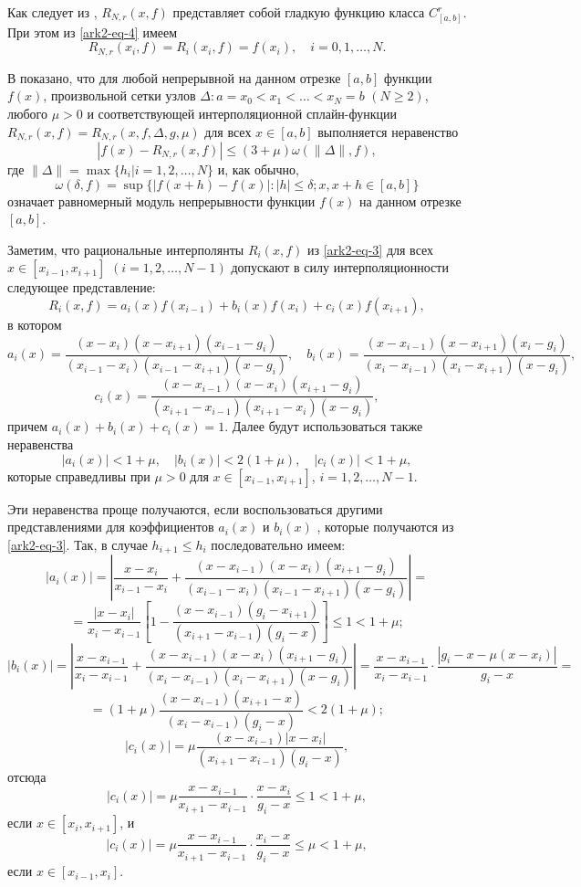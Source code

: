 Как следует из \cite{ark-9}, $R_{N,r}(x,f)$ представляет собой гладкую функцию
 класса $C^r_{[a,b]}$. При этом из \eqref{ark2-eq-4} имеем
\begin{equation}\label{ark2-eq-5}
R_{N,r}(x_i,f)=R_i(x_i,f)=f(x_i),\quad i=0,1,\dots,N.
\end{equation}

В \cite{ark-10} показано, что для любой непрерывной на данном отрезке $[a,b]$ функции $f(x)$,
произвольной сетки узлов $\Delta: a=x_0<x_1<\dots<x_N=b$ $(N\geqslant 2)$, любого
$\mu>0$ и соответствующей интерполяционной сплайн-функции
$R_{N,r}(x,f)=R_{N,r}(x,f,\Delta,g,\mu)$ для всех $x\in[a,b]$ выполняется неравенство
\begin{equation}\label{ark2-eq-6}
|f(x)-R_{N,r}(x,f)|\leqslant (3+\mu)\omega(\|\Delta\|,f),
\end{equation}
где $\|\Delta\|=\max\{h_i|i=1,2,\dots,N\}$ и, как обычно,
$$
\omega(\delta, f)=\sup\{|f(x+h)-f(x)|: |h|\leqslant \delta; x,x+h\in [a,b]\}
$$
означает равномерный модуль непрерывности функции $f(x)$ на данном отрезке $[a,b]$.

Заметим, что рациональные интерполянты $R_i(x,f)$ из \eqref{ark2-eq-3} для всех $x\in[x_{i-1},x_{i+1}]$
$(i=1,2,\dots,N-1)$ допускают в силу интерполяционности следующее представление:
\begin{equation}\label{ark2-eq-7}
R_i(x,f)=a_i(x)f(x_{i-1})+b_i(x)f(x_i)+c_i(x)f(x_{i+1}),
\end{equation}
в котором
$$
a_i(x)=\frac{(x-x_i)(x-x_{i+1})(x_{i-1}-g_i)}
{(x_{i-1}-x_i)(x_{i-1}-x_{i+1})(x-g_i)},
\quad
b_i(x)=\frac{(x-x_{i-1})(x-x_{i+1})(x_i-g_i)}
{(x_i-x_{i-1})(x_i-x_{i+1})(x-g_i)},
$$
$$
c_i(x)=\frac{(x-x_{i-1})(x-x_i)(x_{i+1}-g_i)}
{(x_{i+1}-x_{i-1})(x_{i+1}-x_i)(x-g_i)},
$$
причем $a_i(x)+b_i(x)+c_i(x)=1$.
Далее будут использоваться также неравенства
\begin{equation}\label{ark2-eq-8}
|a_i(x)|<1+\mu, \quad |b_i(x)|<2(1+\mu),\quad |c_i(x)|<1+\mu,
\end{equation}
которые справедливы при $\mu>0$ для $x\in[x_{i-1},x_{i+1}]$, $i=1,2,\dots,N-1$.

Эти неравенства проще получаются, если воспользоваться другими представлениями
для коэффициентов $a_i(x)$ и $b_i(x)$  , которые получаются \cite{ark-10} из \eqref{ark2-eq-3}.
Так, в случае $h_{i+1}\leqslant h_i$ последовательно имеем:
$$
|a_i(x)|=\left\vert \frac{x-x_i}{x_{i-1}-x_i}+\frac{(x-x_{i-1})(x-x_i)(x_{i+1}-g_i)}
{(x_{i-1}-x_i)(x_{i-1}-x_{i+1})(x-g_i)}\right\vert=
$$
$$
=\frac{|x-x_i|}{x_i-x_{i-1}}
\left[1-\frac{(x-x_{i-1})(g_i-x_{i+1})}{(x_{i+1}-x_{i-1})(g_i-x)}\right]\leqslant 1<1+\mu;
$$
$$
|b_i(x)|=\left\vert \frac{x-x_{i-1}}{x_i-x_{i-1}}+\frac{(x-x_{i-1})(x-x_i)(x_{i+1}-g_i)}
{(x_i-x_{i-1})(x_i-x_{i+1})(x-g_i)}\right\vert=
\frac{x-x_{i-1}}{x_i-x_{i-1}}\cdot\frac{|g_i-x-\mu(x-x_i)|}{g_i-x}=
$$
$$
=(1+\mu)\frac{(x-x_{i-1})(x_{i+1}-x)}{(x_i-x_{i-1})(g_i-x)}<2(1+\mu);
$$
$$
|c_i(x)|=\mu
\frac{(x-x_{i-1})|x-x_i|}{(x_{i+1}-x_{i-1})(g_i-x)},
$$
отсюда
$$
|c_i(x)|=\mu\frac{x-x_{i-1}}{x_{i+1}-x_{i-1}}\cdot \frac{x-x_i}{g_i-x}\leqslant 1<1+\mu,
$$
если $x\in[x_i, x_{i+1}]$, и
$$
|c_i(x)|=\mu\frac{x-x_{i-1}}{x_{i+1}-x_{i-1}}\cdot \frac{x_i-x}{g_i-x}\leqslant \mu<1+\mu,
$$
если $x\in[x_{i-1}, x_i]$.

